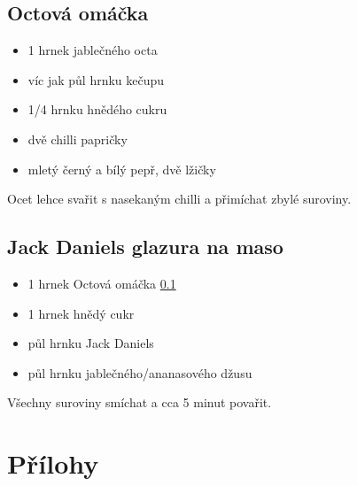\documentclass[10pt,a4paper]{article}
\newenvironment{myitemize}
{ \begin{itemize}
    \setlength{\itemsep}{0pt}
    \setlength{\parskip}{0pt}
    \setlength{\parsep}{0pt}     }
{ \end{itemize}                  }
\begin{document}
\subsection{Octová omáčka}
\label{fig:octovaOmacka}
\begin{minipage}[t]{0,5\textwidth}
\begin{myitemize} 
\item 1 hrnek jablečného octa
\item víc jak půl hrnku kečupu
\item 1/4 hrnku hnědého cukru
\item dvě chilli papričky
\item mletý černý a bílý pepř, dvě lžičky
\end{myitemize}
\end{minipage}
\begin{minipage}[t]{0,5\textwidth}
Ocet lehce svařit s nasekaným chilli a přimíchat zbylé suroviny.
\end{minipage}
\subsection{Jack Daniels glazura na maso}
\label{fig:JDglazura}
\begin{minipage}[t]{0,5\textwidth}
\begin{myitemize} 
\item 1 hrnek Octová omáčka \ref{fig:octovaOmacka}
\item 1 hrnek hnědý cukr
\item půl hrnku Jack Daniels
\item půl hrnku jablečného/ananasového džusu
\end{myitemize}
\end{minipage}
\begin{minipage}[t]{0,5\textwidth}
Všechny suroviny smíchat a cca 5 minut povařit.
\end{minipage}
\pagebreak
\section{Přílohy}
\end{document}
